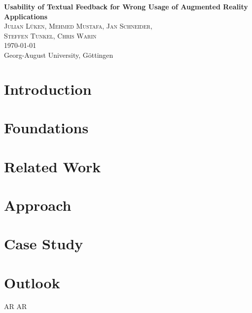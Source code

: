 \documentclass[11pt, a4paper]{article}
\newcommand{\mytitle}{Usability of Textual Feedback for Wrong Usage of Augmented Reality Applications}
\newcommand{\myauthor}{Julian Lüken, Mehmed Mustafa, Jan Schneider,\\ Steffen Tunkel, Chris Warin}
\newcommand{\myuni}{Georg-August University, Göttingen}
\newcommand{\titlespace}{1.5em}
\newenvironment{myabstract}{\begin{abstract}\begin{itshape}}{\end{itshape}\end{abstract}}
\begin{document}
	\begin{acronym}
	\end{acronym}

	\pagestyle{empty}
	\begin{center}
		\begin{minipage}{.8\textwidth}
			\centering
			\huge\textbf{\mytitle}\normalsize\\[\titlespace]
			\textsc{\myauthor}\\[\titlespace]
			\today\\[\titlespace]
			\myuni\\[\titlespace]
		\end{minipage}
	\end{center}
	\vspace{\titlespace}
	\begin{myabstract}
		\lipsum[1-3]
	\end{myabstract}
	\pagestyle{myheadings}
	\pagebreak


	\section*{Introduction}

		\lipsum[1]

	\section*{Foundations}
		\lipsum[2]

	\section*{Related Work}
		\lipsum[3]

	\section*{Approach}
		\lipsum[4]

	\section*{Case Study}
		\lipsum[5]

	\section*{Outlook}
		\lipsum[6] \cite{Trivedi1985} \ac{AR} \ac{AR}

	\pagebreak
	\printbibliography
\restoregeometry
\end{document}
